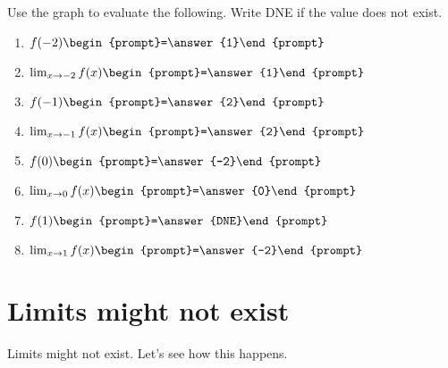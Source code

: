 \documentclass[handout]{ximera}
\begin{document}
\begin{question}
\begin{image}
\end{image}
  Use the graph to evaluate the following. Write DNE if the value does
  not exist.
  \begin{enumerate}
    \item $f(-2) \begin{prompt}=\answer{1}\end{prompt}$
    \item $\lim_{x\to -2}f(x)\begin{prompt}=\answer{1}\end{prompt}$
    \item $f(-1) \begin{prompt}=\answer{2}\end{prompt}$
    \item $\lim_{x\to -1}f(x) \begin{prompt}=\answer{2}\end{prompt}$
    \item $f(0) \begin{prompt}=\answer{-2}\end{prompt}$
    \item $\lim_{x\to 0} f(x) \begin{prompt}=\answer{0}\end{prompt}$
    \item $f(1) \begin{prompt}=\answer{DNE}\end{prompt}$
    \item $\lim_{x\to 1} f(x) \begin{prompt}=\answer{-2}\end{prompt}$
  \end{enumerate}
\end{question}





\section{Limits might not exist}

Limits might not exist. Let's see how this happens.
\end{document}
